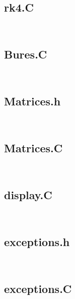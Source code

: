 \subsection{rk4.C}

\texttt{
\small
}

\subsection{Bures.C}

\texttt{
\small
}

\subsection{Matrices.h}

\texttt{
\small
}

\subsection{Matrices.C}

\texttt{
\small
}

\subsection{display.C}

\texttt{
\small
}

\subsection{exceptions.h}

\texttt{
\small
}

\subsection{exceptions.C}

